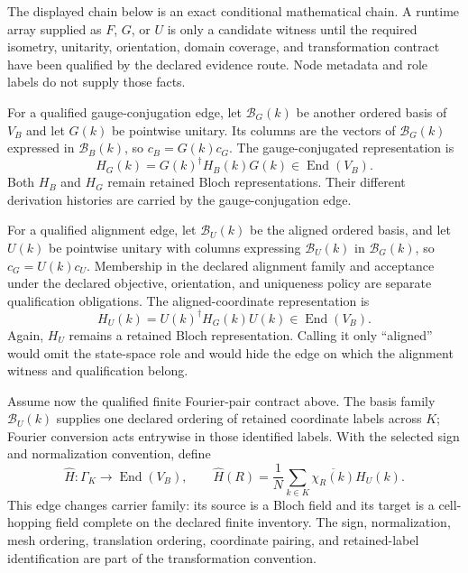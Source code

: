 The displayed chain below is an exact conditional mathematical chain. A runtime
array supplied as $F$, $G$, or $U$ is only a candidate witness until the required
isometry, unitarity, orientation, domain coverage, and transformation contract
have been qualified by the declared evidence route. Node metadata and role
labels do not supply those facts.

For a qualified gauge-conjugation edge, let $\mathcal B_G(k)$ be another
ordered basis of $V_B$ and let $G(k)$ be pointwise unitary. Its columns are the
vectors of $\mathcal B_G(k)$ expressed in $\mathcal B_B(k)$, so
$c_B=G(k)c_G$. The gauge-conjugated representation is
\begin{equation}
  H_G(k)=G(k)^\dagger H_B(k)G(k)
  \in\operatorname{End}(V_B).
  \label{eq:representation-carrier-gauge-conjugation}
\end{equation}
Both $H_B$ and $H_G$ remain retained Bloch representations. Their different
derivation histories are carried by the gauge-conjugation edge.

For a qualified alignment edge, let $\mathcal B_U(k)$ be the aligned ordered
basis, and let $U(k)$ be pointwise unitary with columns expressing
$\mathcal B_U(k)$ in $\mathcal B_G(k)$, so $c_G=U(k)c_U$. Membership in the
declared alignment family and acceptance under the declared objective,
orientation, and uniqueness policy are separate qualification obligations.
The aligned-coordinate representation is
\begin{equation}
  H_U(k)=U(k)^\dagger H_G(k)U(k)
  \in\operatorname{End}(V_B).
  \label{eq:representation-carrier-alignment}
\end{equation}
Again, $H_U$ remains a retained Bloch representation. Calling it only
``aligned'' would omit the state-space role and would hide the edge on which the
alignment witness and qualification belong.

Assume now the qualified finite Fourier-pair contract above. The basis family
$\mathcal B_U(k)$ supplies one declared ordering of retained coordinate labels
across $K$; Fourier conversion acts entrywise in those identified labels. With
the selected sign and normalization convention, define
\begin{equation}
  \widehat H:\Gamma_K\longrightarrow\operatorname{End}(V_B),
  \qquad
  \widehat H(R)
  =\frac{1}{N}\sum_{k\in K}
    \overline{\chi_R(k)}H_U(k).
  \label{eq:representation-carrier-forward-fourier}
\end{equation}
This edge changes carrier family: its source is a Bloch field and its target is
a cell-hopping field complete on the declared finite inventory. The sign,
normalization, mesh ordering, translation ordering, coordinate pairing, and
retained-label identification are part of the transformation convention.

